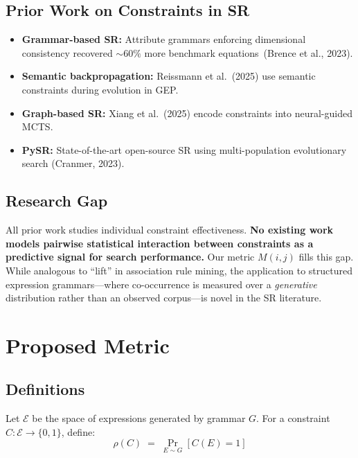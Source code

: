 \documentclass[11pt,a4paper]{article}
\begin{document}
\subsection{Prior Work on Constraints in SR}
\begin{itemize}
  \item \textbf{Grammar-based SR:} Attribute grammars enforcing dimensional consistency recovered ${\sim}60\%$ more benchmark equations~(Brence et al., 2023).
  \item \textbf{Semantic backpropagation:} Reissmann et al.\ (2025) use semantic constraints during evolution in GEP.
  \item \textbf{Graph-based SR:} Xiang et al.\ (2025) encode constraints into neural-guided MCTS.
  \item \textbf{PySR:} State-of-the-art open-source SR using multi-population evolutionary search (Cranmer, 2023).
\end{itemize}

\subsection{Research Gap}
\begin{notebox}
All prior work studies individual constraint effectiveness. \textbf{No existing work models pairwise statistical interaction between constraints as a predictive signal for search performance.} Our metric $M(i,j)$ fills this gap. While analogous to ``lift'' in association rule mining, the application to structured expression grammars---where co-occurrence is measured over a \textit{generative} distribution rather than an observed corpus---is novel in the SR literature.
\end{notebox}

\section{Proposed Metric}
\label{sec:metric}

\subsection{Definitions}
Let $\mathcal{E}$ be the space of expressions generated by grammar $G$. For a constraint $C: \mathcal{E} \to \{0,1\}$, define:
\begin{equation}
  \rho(C) \;=\; \Pr_{E \sim G}[C(E) = 1]
\end{equation}
\end{document}
